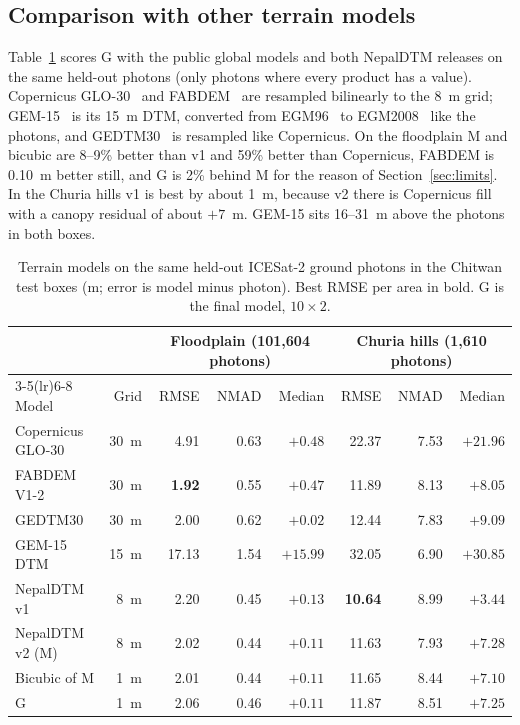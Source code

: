 \documentclass[11pt]{article}
\begin{document}
\subsection{Comparison with other terrain models}
\label{sec:compare}
Table~\ref{tab:compare} scores G with the public global models and both NepalDTM releases on the same held-out photons
(only photons where every product has a value). Copernicus GLO-30~\citep{esa2021copernicus} and
FABDEM~\citep{hawker2022fabdem} are resampled bilinearly to the 8~m grid; GEM-15~\citep{gem15} is its 15~m DTM, converted
from EGM96~\citep{lemoine1998egm96} to EGM2008~\citep{pavlis2012egm2008} like the photons, and
GEDTM30~\citep{ho2025gedtm30} is resampled like Copernicus. On the floodplain M and bicubic are 8--9\% better than v1 and
59\% better than Copernicus, FABDEM is 0.10~m better still, and G is 2\% behind M for the reason of
Section~\ref{sec:limits}. In the Churia hills v1 is best by about 1~m, because v2 there is Copernicus fill with a canopy
residual of about $+7$~m. GEM-15 sits 16--31~m above the photons in both boxes.
\begin{table}[!htbp]
\centering
\caption{Terrain models on the same held-out ICESat-2 ground photons in the Chitwan test boxes (m; error is model minus
photon). Best RMSE per area in bold. G is the final model, $10\times2$.}
\label{tab:compare}
\small\setlength{\tabcolsep}{4pt}
\begin{tabular}{lrrrrrrr}
\toprule
 & & \multicolumn{3}{c}{Floodplain (101{,}604 photons)} & \multicolumn{3}{c}{Churia hills (1{,}610 photons)} \\
\cmidrule(lr){3-5}\cmidrule(lr){6-8}
Model & Grid & RMSE & NMAD & Median & RMSE & NMAD & Median \\
\midrule
Copernicus GLO-30 & 30~m & 4.91 & 0.63 & $+0.48$ & 22.37 & 7.53 & $+21.96$ \\
FABDEM V1-2 & 30~m & \textbf{1.92} & 0.55 & $+0.47$ & 11.89 & 8.13 & $+8.05$ \\
GEDTM30 & 30~m & 2.00 & 0.62 & $+0.02$ & 12.44 & 7.83 & $+9.09$ \\
GEM-15 DTM & 15~m & 17.13 & 1.54 & $+15.99$ & 32.05 & 6.90 & $+30.85$ \\
NepalDTM v1~\citep{paudel2026nepaldtm} & 8~m & 2.20 & 0.45 & $+0.13$ & \textbf{10.64} & 8.99 & $+3.44$ \\
NepalDTM v2 (M)~\citep{paudel2026nepaldtmv2} & 8~m & 2.02 & 0.44 & $+0.11$ & 11.63 & 7.93 & $+7.28$ \\
Bicubic of M & 1~m & 2.01 & 0.44 & $+0.11$ & 11.65 & 8.44 & $+7.10$ \\
G & 1~m & 2.06 & 0.46 & $+0.11$ & 11.87 & 8.51 & $+7.25$ \\
\bottomrule
\end{tabular}
\end{table}
\end{document}
